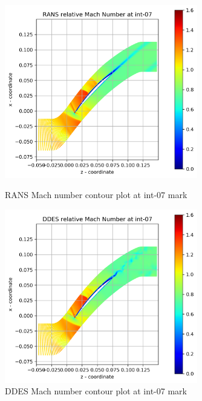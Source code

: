 \begin{figure}[ht]
  \centering
%  

  \includegraphics[width=0.75\textwidth]{Pictures/rans-mach-int-07.png}
  \caption{RANS Mach number contour plot at int-07 mark} \label{int-07-rans-mach}
  
   \vspace*{\floatsep}%
   
  \includegraphics[width=0.75\textwidth]{Pictures/ddes-mach-int-07.png}
  \caption{DDES Mach number contour plot at int-07 mark} \label{int-07-ddes-mach}
\end{figure}

